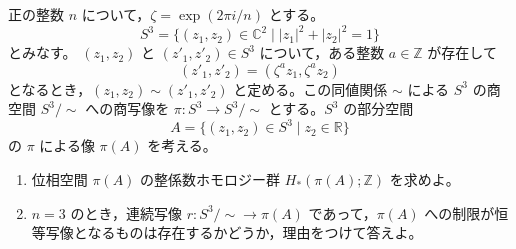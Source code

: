 \documentclass[12pt]{jlreq}
\newcommand{\C}{\mathbb{C}}
\newcommand{\R}{\mathbb{R}}
\newcommand{\Z}{\mathbb{Z}}
\begin{document}
正の整数 \(n\) について，\(\zeta=\exp(2\pi i/n)\) とする。
\[
  S^3=\{(z_1,z_2)\in\C^2\mid |z_1|^2+|z_2|^2=1\}
\]
とみなす。 \((z_1,z_2)\) と \((z'_1,z'_2)\in S^3\) について，ある整数 \(a\in\Z\) が存在して
\[
  (z'_1,z'_2)=(\zeta^a z_1,\zeta^a z_2)
\]
となるとき，\((z_1,z_2)\sim(z'_1,z'_2)\) と定める。この同値関係 \(\sim\) による \(S^3\) の商空間 \(S^3/\sim\) への商写像を \(\pi:S^3\to S^3/\sim\) とする。\(S^3\) の部分空間
\[
  A=\{(z_1,z_2)\in S^3\mid z_2\in\R\}
\]
の \(\pi\) による像 \(\pi(A)\) を考える。

\begin{enumerate}
  \item 位相空間 \(\pi(A)\) の整係数ホモロジー群 \(H_*(\pi(A);\Z)\) を求めよ。
  \item \(n=3\) のとき，連続写像 \(r:S^3/\sim\to\pi(A)\) であって，\(\pi(A)\) への制限が恒等写像となるものは存在するかどうか，理由をつけて答えよ。
\end{enumerate}
\end{document}
